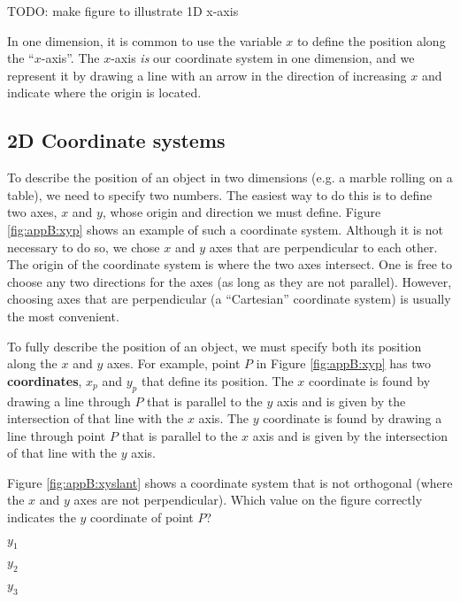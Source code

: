 TODO: make figure to illustrate 1D x-axis

In one dimension, it is common to use the variable $x$ to define the position along the ``$x$-axis''. The $x$-axis \textit{is} our coordinate system in one dimension, and we represent it by drawing a line with an arrow in the direction of increasing $x$ and indicate where the origin is located.
 
\subsection{2D Coordinate systems}
To describe the position of an object in two dimensions (e.g. a marble rolling on a table), we need to specify two numbers. The easiest way to do this is to define two axes, $x$ and $y$, whose origin and direction we must define. Figure \ref{fig:appB:xyp} shows an example of such a coordinate system. Although it is not necessary to do so, we chose $x$ and $y$ axes that are perpendicular to each other. The origin of the coordinate system is where the two axes intersect. One is free to choose any two directions for the axes (as long as they are not parallel). However, choosing axes that are perpendicular (a ``Cartesian'' coordinate system) is usually the most convenient.

To fully describe the position of an object, we must specify both its position along the $x$ and $y$ axes. For example, point $P$ in Figure \ref{fig:appB:xyp} has two \textbf{coordinates}, $x_p$ and $y_p$ that define its position. The $x$ coordinate is found by drawing a line through $P$ that is parallel to the $y$ axis and is given by the intersection of that line with the $x$ axis. The $y$ coordinate is found by drawing a line through point $P$ that is parallel to the $x$ axis and is given by the intersection of that line with the $y$ axis.


\begin{checkpointMC}{Figure \ref{fig:appB:xyslant} shows a coordinate system that is not orthogonal (where the $x$ and $y$ axes are not perpendicular). Which value on the figure correctly indicates the $y$ coordinate of point $P$?
}
\item $y_1$ %
\item $y_2$
\item $y_3$
\end{checkpointMC}

